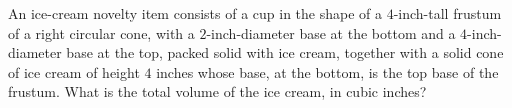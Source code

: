 An ice-cream novelty item consists of a cup in the shape of a $4$-inch-tall frustum of a right circular cone, with a $2$-inch-diameter base at the bottom and a $4$-inch-diameter base at the top, packed solid with ice cream, together with a solid cone of ice cream of height $4$ inches whose base, at the bottom, is the top base of the frustum. What is the total volume of the ice cream, in cubic inches?
